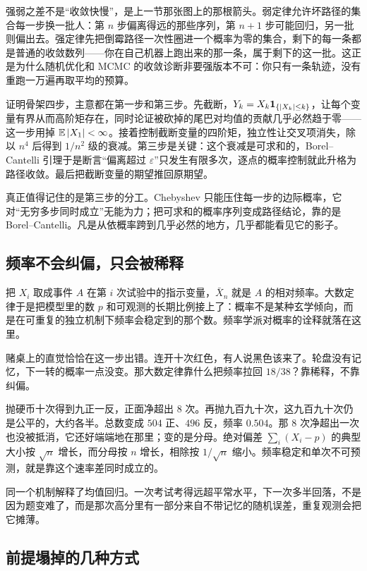 强弱之差不是``收敛快慢''，是上一节那张图上的那根箭头。弱定律允许坏路径的集合每一步换一批人：第 \(n\) 步偏离得远的那些序列，第 \(n+1\) 步可能回归，另一批则偏出去。强定律先把倒霉路径一次性圈进一个概率为零的集合，剩下的每一条都是普通的收敛数列——你在自己机器上跑出来的那一条，属于剩下的这一批。这正是为什么随机优化和 MCMC 的收敛诊断非要强版本不可：你只有一条轨迹，没有重跑一万遍再取平均的预算。

证明骨架四步，主意都在第一步和第三步。先截断，\(Y_k=X_k\mathbf{1}_{\left\{\left|X_k\right|\le k\right\}}\)，让每个变量有界从而高阶矩存在，同时论证被砍掉的尾巴对均值的贡献几乎必然趋于零——这一步用掉 \(\mathbb{E}\left|X_1\right|<\infty\)。接着控制截断变量的四阶矩，独立性让交叉项消失，除以 \(n^4\) 后得到 \(1/n^2\) 级的衰减。第三步是关键：这个衰减是可求和的，Borel--Cantelli 引理于是断言``偏离超过 \(\varepsilon\)''只发生有限多次，逐点的概率控制就此升格为路径收敛。最后把截断变量的期望推回原期望。

真正值得记住的是第三步的分工。Chebyshev 只能压住每一步的边际概率，它对``无穷多步同时成立''无能为力；把可求和的概率序列变成路径结论，靠的是 Borel--Cantelli。凡是从依概率跨到几乎必然的地方，几乎都能看见它的影子。

\subsection{频率不会纠偏，只会被稀释}

把 \(X_i\) 取成事件 \(A\) 在第 \(i\) 次试验中的指示变量，\(\bar X_n\) 就是 \(A\) 的相对频率。大数定律于是把模型里的数 \(p\) 和可观测的长期比例接上了：概率不是某种玄学倾向，而是在可重复的独立机制下频率会稳定到的那个数。频率学派对概率的诠释就落在这里。

赌桌上的直觉恰恰在这一步出错。连开十次红色，有人说黑色该来了。轮盘没有记忆，下一转的概率一点没变。那大数定律靠什么把频率拉回 \(18/38\)？靠稀释，不靠纠偏。

抛硬币十次得到九正一反，正面净超出 \(8\) 次。再抛九百九十次，这九百九十次仍是公平的，大约各半。总数变成 \(504\) 正、\(496\) 反，频率 \(0.504\)。那 \(8\) 次净超出一次也没被抵消，它还好端端地在那里；变的是分母。绝对偏差 \(\sum_i(X_i-p)\) 的典型大小按 \(\sqrt n\) 增长，而分母按 \(n\) 增长，相除按 \(1/\sqrt n\) 缩小。频率稳定和单次不可预测，就是靠这个速率差同时成立的。

同一个机制解释了均值回归。一次考试考得远超平常水平，下一次多半回落，不是因为题变难了，而是那次高分里有一部分来自不带记忆的随机误差，重复观测会把它摊薄。

\subsection{前提塌掉的几种方式}

